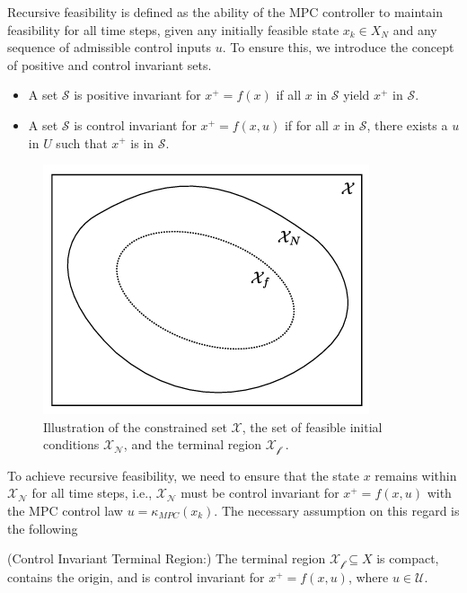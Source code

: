 Recursive feasibility is defined as the ability of the MPC controller to maintain feasibility for all time steps, given any initially feasible state \( x_k \in X_N \) and any sequence of admissible control inputs \( u \). To ensure this, we introduce the concept of positive and control invariant sets. 
\begin{itemize}
    \item A set \( \mathcal{S} \) is positive invariant for \( x^+ = f(x) \) if all \( x \) in \( \mathcal{S} \) yield \( x^+ \) in \( \mathcal{S} \).
    \item A set \( \mathcal{S} \) is control invariant for \( x^+ = f(x,u) \) if for all \( x \) in \( \mathcal{S} \), there exists a \( u \) in \( U \) such that \( x^+ \) is in \( \mathcal{S} \).
\end{itemize}

\begin{figure}
    \centering
    \includegraphics[width=0.6\linewidth]{figures/feasible_set.png}
    \caption{ Illustration of the constrained set \(\mathcal{X}\), the set of feasible initial conditions \( \mathcal{X_N}  \),
 and the terminal region \( \mathcal{X_f} \) \cite{maiworm2021gaussian} .}
    \label{fig:enter-label}
\end{figure}


To achieve recursive feasibility, we need to ensure that the state \( x \) remains within \( \mathcal{X_N} \) for all time steps, i.e., \( \mathcal{X_N}  \) must be control invariant for \( x^+ = f(x,u) \) with the MPC control law \( u = \kappa_{MPC}(x_k) \). The necessary assumption on this regard is the following
\begin{assumption}\label{assumption:assumption4}
    (Control Invariant Terminal Region:) The terminal region \( \mathcal{X_f} \subseteq X \) is compact, contains the origin, and is control invariant for \( x^+ = f(x,u) \), where \( u \in \mathcal{U} \).
\end{assumption}

